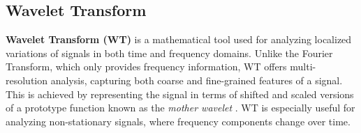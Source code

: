 



\subsection{Wavelet Transform}
\textbf{Wavelet Transform (WT)} is a mathematical tool used for analyzing localized variations of signals in both time and frequency domains. Unlike the Fourier Transform, which only provides frequency information, WT offers multi-resolution analysis, capturing both coarse and fine-grained features of a signal. This is achieved by representing the signal in terms of shifted and scaled versions of a prototype function known as the \textit{mother wavelet} \cite{mallat1989theory}. WT is especially useful for analyzing non-stationary signals, where frequency components change over time.

